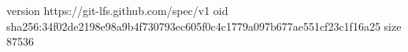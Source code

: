 version https://git-lfs.github.com/spec/v1
oid sha256:34f02de2198e98a9b4f730793ec605f0c4c1779a097b677ae551cf23c1f16a25
size 87536
